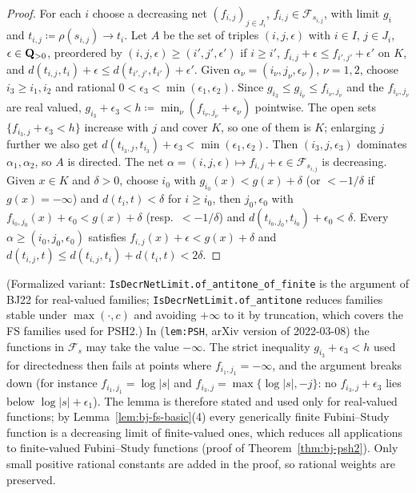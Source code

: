 \begin{proof}
For each $i$ choose a decreasing net $(f_{i,j})_{j\in J_i}$, $f_{i,j}\in\mathcal F_{s_{i,j}}$, with limit
$g_i$ and $t_{i,j}\coloneqq\rho(s_{i,j})\to t_i$. Let $A$ be the set of triples $(i,j,\epsilon)$ with
$i\in I$, $j\in J_i$, $\epsilon\in\mathbf{Q}_{>0}$, preordered by $(i,j,\epsilon)\ge(i',j',\epsilon')$ if $i\ge i'$,
$f_{i,j}+\epsilon\le f_{i',j'}+\epsilon'$ on $K$, and
$d(t_{i,j},t_i)+\epsilon\le d(t_{i',j'},t_{i'})+\epsilon'$. Given $\alpha_\nu=(i_\nu,j_\nu,\epsilon_\nu)$,
$\nu=1,2$, choose $i_3\ge i_1,i_2$ and rational $0<\epsilon_3<\min(\epsilon_1,\epsilon_2)$. Since
$g_{i_3}\le g_{i_\nu}\le f_{i_\nu,j_\nu}$ and the $f_{i_\nu,j_\nu}$ are real valued,
$g_{i_3}+\epsilon_3<h\coloneqq\min_\nu(f_{i_\nu,j_\nu}+\epsilon_\nu)$ pointwise. The open sets
$\{f_{i_3,j}+\epsilon_3<h\}$ increase with $j$ and cover $K$, so one of them is $K$; enlarging $j$
further we also get $d(t_{i_3,j},t_{i_3})+\epsilon_3<\min(\epsilon_1,\epsilon_2)$. Then
$(i_3,j,\epsilon_3)$ dominates $\alpha_1,\alpha_2$, so $A$ is directed. The net
$\alpha=(i,j,\epsilon)\mapsto f_{i,j}+\epsilon\in\mathcal F_{s_{i,j}}$ is decreasing. Given $x\in K$ and
$\delta>0$, choose $i_0$ with $g_{i_0}(x)<g(x)+\delta$ (or $<-1/\delta$ if $g(x)=-\infty$) and
$d(t_i,t)<\delta$ for $i\ge i_0$, then $j_0,\epsilon_0$ with $f_{i_0,j_0}(x)+\epsilon_0<g(x)+\delta$
(resp.\ $<-1/\delta$) and $d(t_{i_0,j_0},t_{i_0})+\epsilon_0<\delta$. Every $\alpha\ge(i_0,j_0,\epsilon_0)$
satisfies $f_{i,j}(x)+\epsilon<g(x)+\delta$ and $d(t_{i,j},t)\le d(t_{i,j},t_i)+d(t_i,t)<2\delta$.
\end{proof}

\begin{remark}\label{rmk:bj-psh-diagonal-finite}
(Formalized variant: \texttt{IsDecrNetLimit.of\_antitone\_of\_finite} is the argument of BJ22 for real-valued families; \texttt{IsDecrNetLimit.of\_antitone} reduces families stable under $\max(\cdot,c)$ and avoiding $+\infty$ to it by truncation, which covers the FS families used for PSH2.) In \cite[Lemma~4.6]{BJ22} (\texttt{lem:PSH}, arXiv version of 2022-03-08) the functions in $\mathcal F_s$ may take the value $-\infty$. The strict
inequality $g_{i_3}+\epsilon_3<h$ used for directedness then fails at points where
$f_{i_1,j_1}=-\infty$, and the argument breaks down (for instance $f_{i_1,j_1}=\log|s|$ and
$f_{i_3,j}=\max\{\log|s|,-j\}$: no $f_{i_3,j}+\epsilon_3$ lies below $\log|s|+\epsilon_1$). The lemma is
therefore stated and used only for real-valued functions; by Lemma~\ref{lem:bj-fs-basic}(4) every
generically finite Fubini--Study function is a decreasing limit of finite-valued ones, which reduces all
applications to finite-valued Fubini--Study functions (proof of Theorem~\ref{thm:bj-psh2}). Only small
positive rational constants are added in the proof, so rational weights are preserved.
\end{remark}


